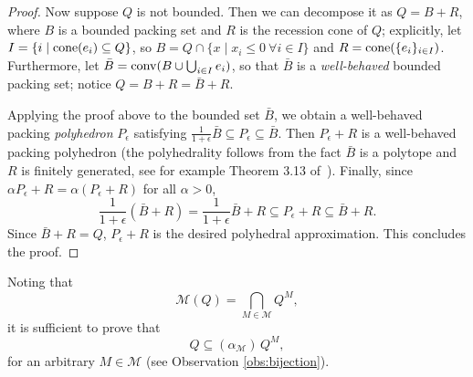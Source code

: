 \documentclass[11pt]{article}
\newcommand{\Z}{\mathbb{Z}}
\newcommand{\R}{\mathbb{R}}
\DeclareMathOperator{\conv}{conv}
\DeclareMathOperator{\cone}{cone}
\renewcommand{\L}{\mathcal{L}}
\newcommand{\Mset}{M}
\newcommand{\M}{\mathcal{\Mset}}
\newcommand{\cred}{\color{black}}
\def\conv{\mathop{\rm conv}}
\def\cone{\mathop{\rm cone}}
\begin{document}
\begin{proof}
{\cred Now suppose $Q$ is not bounded. Then we can decompose it as $Q = B + R$, where $B$ is a bounded packing set and $R$ is the recession cone of $Q$; explicitly, let $I = \{i \mid \cone(e_i) \subseteq Q\}$, so $B = Q \cap \{x \mid x_i \le 0~\forall i \in I\}$ and $R = \cone(\{e_i\}_{i \in I})$. Furthermore, let $\bar{B} = \conv(B \cup \bigcup_{i \in I} e_i)$, so that $\bar{B}$ is a \emph{well-behaved} bounded packing set; notice $Q = B + R = \bar{B} + R$. 
	
	Applying the proof above to the bounded set $\bar{B}$, we obtain a well-behaved packing \emph{polyhedron} $P_\epsilon$ satisfying $\frac{1}{1+\epsilon} \bar{B} \subseteq P_\epsilon \subseteq \bar{B}$. Then $P_\epsilon + R$ is a well-behaved packing polyhedron (the polyhedrality follows from the fact $\bar{B}$ is a polytope and $R$ is finitely generated, see for example Theorem 3.13 of~\cite{ConCorZam14b}). Finally, since $\alpha P_\epsilon + R = \alpha (P_\epsilon + R)$ for all $\alpha > 0$, $$\frac{1}{1+\epsilon} (\bar{B} + R) = \frac{1}{1 + \epsilon} \bar{B} + R \subseteq P_\epsilon + R \subseteq \bar{B} + R.$$ Since $\bar{B} + R = Q$, $P_\epsilon + R$ is the desired polyhedral approximation. This concludes the proof. 
	}



\end{proof}

Noting that 
$$\M(Q) = \bigcap_{\Mset \in \M} Q^\Mset,$$
it is sufficient to prove that 
\begin{equation}
\label{eq:Pkplusone}
Q  \subseteq  (\alpha_\M) \,  Q^\Mset,
\end{equation}
{\cred for an arbitrary $M \in \M$} (see Observation \ref{obs:bijection}).
\end{document}
